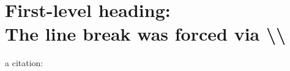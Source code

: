 \documentclass[%
 reprint,
 amsmath,amssymb,
 aps,
]{revtex4-2}
\begin{document}

 \section{\label{sec:level1}First-level heading:\protect\\ The line
 break was forced \lowercase{via} \textbackslash\textbackslash}
 a citation: \cite{feyn54}

\nocite{*}
\end{document}
